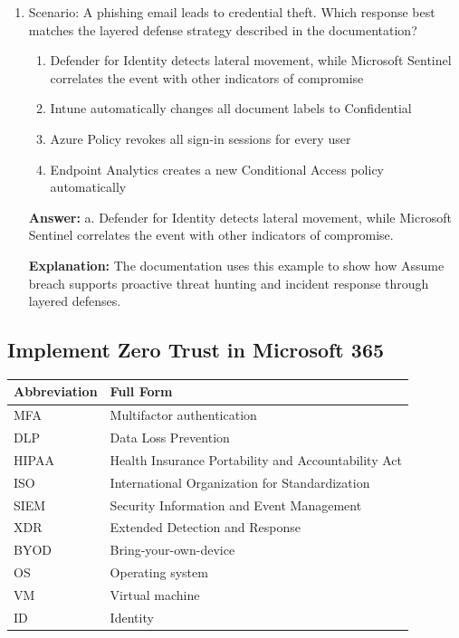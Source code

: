 \documentclass[10pt]{article}
\begin{document}
\begin{enumerate}[leftmargin=*]
\textbf{Answer:} Verify explicitly, Least privilege access, Assume breach.

\textbf{Explanation:} The documentation introduces the principles in this exact order.

\item Scenario: A phishing email leads to credential theft. Which response best matches the layered defense strategy described in the documentation?
\begin{enumerate}[label=\alph*., leftmargin=1.5em]
\item Defender for Identity detects lateral movement, while Microsoft Sentinel correlates the event with other indicators of compromise
\item Intune automatically changes all document labels to Confidential
\item Azure Policy revokes all sign-in sessions for every user
\item Endpoint Analytics creates a new Conditional Access policy automatically
\end{enumerate}
\textbf{Answer:} a. Defender for Identity detects lateral movement, while Microsoft Sentinel correlates the event with other indicators of compromise.

\textbf{Explanation:} The documentation uses this example to show how Assume breach supports proactive threat hunting and incident response through layered defenses.

\end{enumerate}

\subsection{Implement Zero Trust in Microsoft 365}

\begin{center}
\begin{tabular}{>{\raggedright\arraybackslash}p{} >{\raggedright\arraybackslash}p{}}
\toprule
\textbf{Abbreviation} & \textbf{Full Form} \\
\midrule
MFA & Multifactor authentication \\
DLP & Data Loss Prevention \\
HIPAA & Health Insurance Portability and Accountability Act \\
ISO & International Organization for Standardization \\
SIEM & Security Information and Event Management \\
XDR & Extended Detection and Response \\
BYOD & Bring-your-own-device \\
OS & Operating system \\
VM & Virtual machine \\
ID & Identity \\
\bottomrule
\end{tabular}
\end{center}
\end{document}
